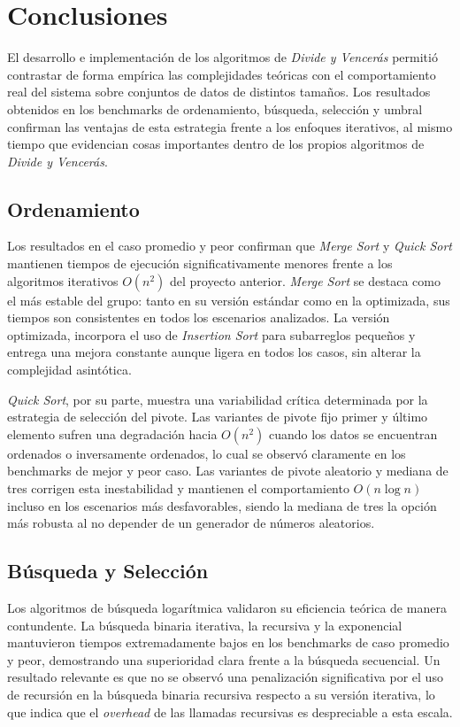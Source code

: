 \chapter{Conclusiones}

El desarrollo e implementación de los algoritmos de \textit{Divide y Vencerás} permitió contrastar de forma empírica las complejidades teóricas con el comportamiento real del sistema sobre conjuntos de datos de distintos tamaños. Los resultados obtenidos en los benchmarks de ordenamiento, búsqueda, selección y umbral confirman las ventajas de esta estrategia frente a los enfoques iterativos, al mismo tiempo que evidencian cosas importantes dentro de los propios algoritmos de \textit{Divide y Vencerás}.

\section{Ordenamiento}

Los resultados en el caso promedio y peor confirman que \textit{Merge Sort} y \textit{Quick Sort} mantienen tiempos de ejecución significativamente menores frente a los algoritmos iterativos \(O(n^2)\) del proyecto anterior. \textit{Merge Sort} se destaca como el más estable del grupo: tanto en su versión estándar como en la optimizada, sus tiempos son consistentes en todos los escenarios analizados. La versión optimizada, incorpora el uso de \textit{Insertion Sort} para subarreglos pequeños y entrega una mejora constante aunque ligera en todos los casos, sin alterar la complejidad asintótica.

\textit{Quick Sort}, por su parte, muestra una variabilidad crítica determinada por la estrategia de selección del pivote. Las variantes de pivote fijo primer y último elemento sufren una degradación hacia \(O(n^2)\) cuando los datos se encuentran ordenados o inversamente ordenados, lo cual se observó claramente en los benchmarks de mejor y peor caso. Las variantes de pivote aleatorio y mediana de tres corrigen esta inestabilidad y mantienen el comportamiento \(O(n \log n)\) incluso en los escenarios más desfavorables, siendo la mediana de tres la opción más robusta al no depender de un generador de números aleatorios.

\section{Búsqueda y Selección}

Los algoritmos de búsqueda logarítmica validaron su eficiencia teórica de manera contundente. La búsqueda binaria iterativa, la recursiva y la exponencial mantuvieron tiempos extremadamente bajos en los benchmarks de caso promedio y peor, demostrando una superioridad clara frente a la búsqueda secuencial. Un resultado relevante es que no se observó una penalización significativa por el uso de recursión en la búsqueda binaria recursiva respecto a su versión iterativa, lo que indica que el \textit{overhead} de las llamadas recursivas es despreciable a esta escala.

